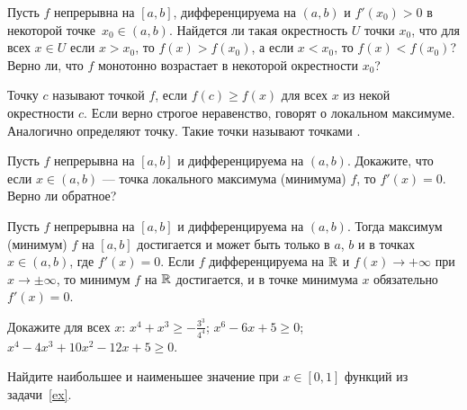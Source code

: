 \documentclass[a4paper,11pt]{article}
\begin{document}




Пусть $f$
непрерывна на $[a,b]$, дифференцируема на $(a,b)$
и $f'(x_0)>0$ в некоторой точке~\hbox{$x_0\in (a,b)$.}
 Найдется ли такая окрестность $U$ точки $x_0$, что
для всех \hbox{$x\in U$} если $x>x_0$, то
$f(x)>f(x_0)$, а если $x<x_0$, то $f(x)<f(x_0)$?
 Верно ли, что $f$ монотонно
возрастает в некоторой окрестности $x_0$?


 Точку $c$ называют точкой  $f$,
если $f(c)\ge f(x)$ для всех $x$ из некой окрестности $c$.
Если верно строгое неравенство, говорят о  локальном максимуме.
Аналогично определяют точку.
Такие точки называют точками .


   Пусть $f$
непрерывна на $[a,b]$  и дифференцируема на $(a,b)$.
Докажите, что если $x\in (a,b)$ --- точка локального
максимума (минимума) $f$, то $f'(x)=0$.  Верно ли обратное?

 Пусть $f$ непрерывна на $[a,b]$ и дифференцируема на $(a,b)$. Тогда максимум (минимум) $f$ на $[a,b]$ достигается и может быть только в $a$, $b$ и в точках $x\in(a,b)$, где $f'(x)=0$.  Если $f$ дифференцируема на $\mathbb{R}$ и $f(x)\rightarrow+\infty$ при $x\rightarrow\pm\infty$, то минимум $f$ на $\mathbb{R}$ достигается, и в точке минимума $x$ обязательно $f'(x)=0$.


 Докажите для всех $x$:
\label{ex}
 $x^4+x^3\ge -\frac{3^3}{4^4}$;
 $x^6-6x+5\ge 0$;
 $x^4-4x^3+10x^2-12x+5\ge 0$.



 Найдите наибольшее и наименьшее значение при $x\in [0,1]$ функций
из задачи~\ref{ex}.
\end{document}
